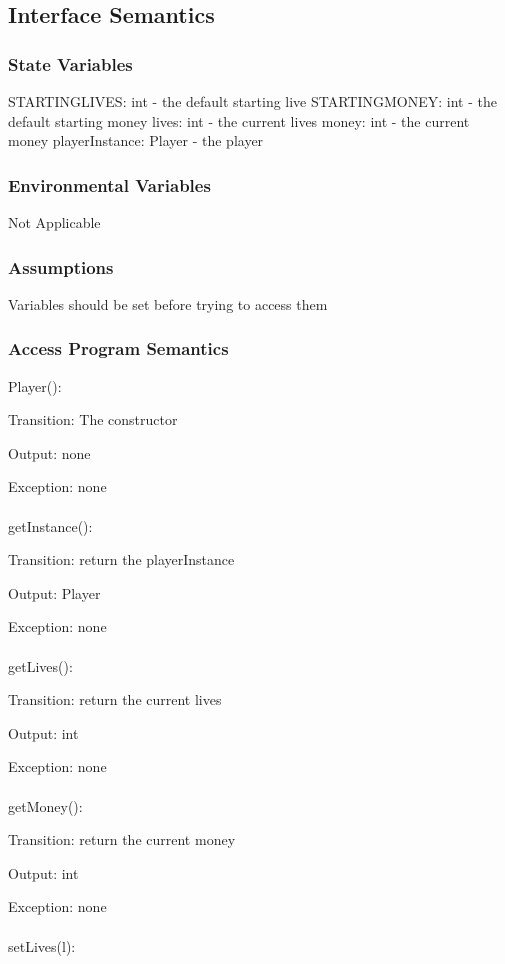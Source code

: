 \documentclass[12,english]{article}
\begin{document}
		\subsection{Interface Semantics}
			\subsubsection{State Variables}
			STARTINGLIVES: int - the default starting live
			STARTINGMONEY: int - the default starting money
			lives: int - the current lives
			money: int - the current money
			playerInstance: Player - the player
			
			\subsubsection{Environmental Variables}
			Not Applicable
			
			\subsubsection{Assumptions}
			Variables should be set before trying to access them
			
			\subsubsection{Access Program Semantics}
			Player():
			
			Transition: The constructor
			
			Output: none
			
			Exception: none\\
			\\
			getInstance():
			
			Transition: return the playerInstance
			
			Output: Player
			
			Exception: none\\
			\\
			getLives():
			
			Transition: return the current lives
			
			Output: int
			
			Exception: none\\
			\\
			getMoney():
			
			Transition: return the current money
			
			Output: int
			
			Exception: none\\
			\\
			setLives(l):
			
\end{document}
